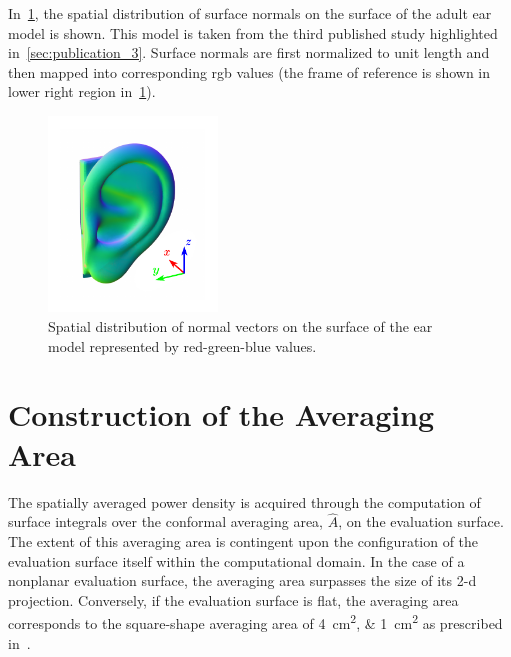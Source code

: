 In~\cref{fig:normals_ear}, the spatial distribution of surface normals on the surface of the adult ear model is shown.
This model is taken from the third published study highlighted in~\cref{sec:publication_3}.
Surface normals are first normalized to unit length and then mapped into corresponding \gls{rgb} values (the frame of reference is shown in lower right region in~\cref{fig:normals_ear}).
\begin{figure}[t]
    \centering
    \includegraphics[width=0.4\textwidth]{artwork/normals.ear.pdf}
    \caption{Spatial distribution of normal vectors on the surface of the ear model represented by red-green-blue values.}
    \label{fig:normals_ear}
\end{figure}

\section{Construction of the Averaging Area}
\label{sec:construction_of_the_averaging_area}
The spatially averaged power density is acquired through the computation of surface integrals over the conformal averaging area, $\hat A$, on the evaluation surface.
The extent of this averaging area is contingent upon the configuration of the evaluation surface itself within the computational domain.
In the case of a nonplanar evaluation surface, the averaging area surpasses the size of its \gls{2-d} projection.
Conversely, if the evaluation surface is flat, the averaging area corresponds to the square-shape averaging area of \SIlist{4;1}{\cm\squared} as prescribed in~\cite{ICNIRP2020Guidelines,IEEE2019Standard}.

